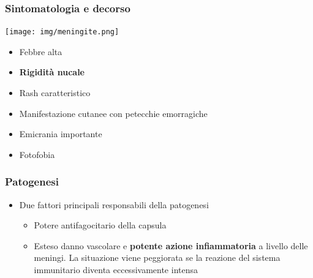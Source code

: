 \documentclass[italian,]{article}
\providecommand{\tightlist}{%
  \setlength{\itemsep}{0pt}\setlength{\parskip}{0pt}}
\begin{document}
\hypertarget{sintomatologia-e-decorso}{%
\subsubsection{Sintomatologia e
decorso}\label{sintomatologia-e-decorso}}

\texttt{[image: img/meningite.png]}~

\begin{itemize}
\tightlist
\item
  Febbre alta
\item
  \textbf{Rigidità nucale}
\item
  Rash caratteristico
\item
  Manifestazione cutanee con petecchie emorragiche
\item
  Emicrania importante
\item
  Fotofobia
\end{itemize}

\hypertarget{patogenesi-3}{%
\subsubsection{Patogenesi}\label{patogenesi-3}}

\begin{itemize}
\tightlist
\item
  Due fattori principali responsabili della patogenesi

  \begin{itemize}
  \tightlist
  \item
    Potere antifagocitario della capsula
  \item
    Esteso danno vascolare e \textbf{potente azione infiammatoria} a
    livello delle meningi. La situazione viene peggiorata se la reazione
    del sistema immunitario diventa eccessivamente intensa
  \end{itemize}
\end{itemize}
\end{document}
